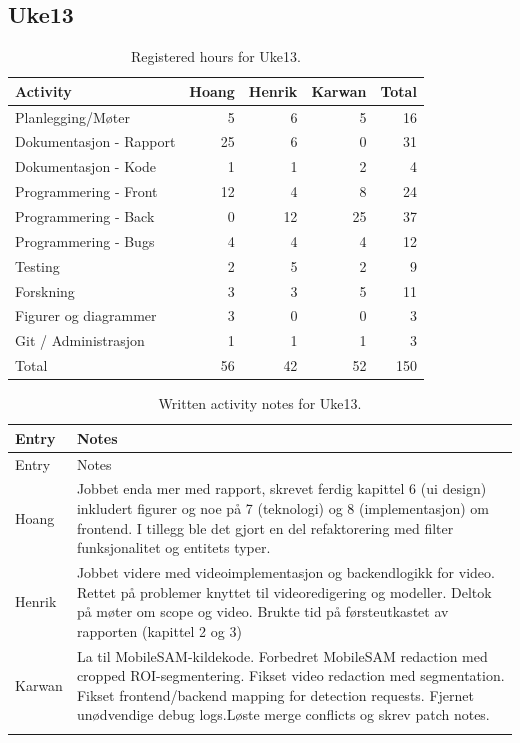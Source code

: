 \subsection{Uke13}

\begin{table}[H]
\centering
\small
\caption{Registered hours for Uke13.}
\label{tab:project-hours-uke13}
\begin{tabular}{lrrrr}
\toprule
Activity & Hoang & Henrik & Karwan & Total \\
\midrule
Planlegging/Møter & 5 & 6 & 5 & 16 \\
Dokumentasjon - Rapport & 25 & 6 & 0 & 31 \\
Dokumentasjon - Kode & 1 & 1 & 2 & 4 \\
Programmering - Front & 12 & 4 & 8 & 24 \\
Programmering - Back & 0 & 12 & 25 & 37 \\
Programmering - Bugs & 4 & 4 & 4 & 12 \\
Testing & 2 & 5 & 2 & 9 \\
Forskning & 3 & 3 & 5 & 11 \\
Figurer og diagrammer & 3 & 0 & 0 & 3 \\
Git / Administrasjon & 1 & 1 & 1 & 3 \\
\midrule
Total & 56 & 42 & 52 & 150 \\
\bottomrule
\end{tabular}
\end{table}

\begin{longtable}{p{}p{}}
\caption{Written activity notes for Uke13.}\\
\toprule
Entry & Notes \\
\midrule
\endfirsthead
\toprule
Entry & Notes \\
\midrule
\endhead
Hoang & Jobbet enda mer med rapport, skrevet ferdig kapittel 6 (ui design) inkludert figurer og noe på 7 (teknologi) og 8 (implementasjon) om frontend. I tillegg ble det gjort en del refaktorering med filter funksjonalitet og entitets typer. \\
\addlinespace
Henrik & Jobbet videre med videoimplementasjon og backendlogikk for video. Rettet på problemer knyttet til videoredigering og modeller. Deltok på møter om scope og video. Brukte tid på førsteutkastet av rapporten (kapittel 2 og 3) \\
\addlinespace
Karwan & La til MobileSAM-kildekode. Forbedret MobileSAM redaction med cropped ROI-segmentering. Fikset video redaction med segmentation. Fikset frontend/backend mapping for detection requests. Fjernet unødvendige debug logs.\newline Løste merge conflicts og skrev patch notes. \\
\addlinespace
\bottomrule
\end{longtable}

